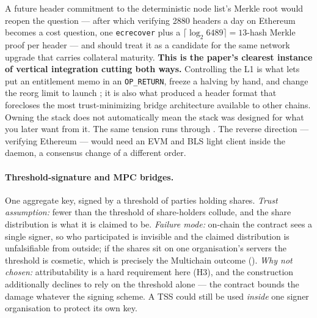 \noindent A future header commitment to the deterministic node list's Merkle root would reopen the
question --- after which verifying \num{2880} headers a day on Ethereum becomes a cost question, one
\texttt{ecrecover} plus a $\lceil \log_2 6489 \rceil = 13$-hash Merkle proof per header
\srcinferred --- and  should treat it as a candidate for the same network
upgrade that carries collateral maturity. \textbf{This is the paper's clearest instance of vertical
integration cutting both ways.} Controlling the L1 is what lets \Flux put an entitlement memo in an
\texttt{OP\_RETURN}, freeze a halving by hand, and change the reorg limit to launch \PoN; it is also
what produced a header format that forecloses the most trust-minimizing bridge architecture
available to other chains. Owning the stack does not automatically mean the stack was designed for
what you later want from it. The same tension runs through . The reverse direction
--- \fluxd verifying Ethereum --- would need an EVM and BLS light client inside the daemon, a
consensus change of a different order.

\paragraph{Threshold-signature and MPC bridges.} One aggregate key, signed by a threshold of parties
holding shares. \emph{Trust assumption:} fewer than the threshold of share-holders collude, and the
share distribution is what it is claimed to be. \emph{Failure mode:} on-chain the contract sees a
single signer, so who participated is invisible and the claimed distribution is unfalsifiable from
outside; if the shares sit on one organisation's servers the threshold is cosmetic, which is
precisely the Multichain outcome (). \emph{Why not chosen:}
attributability is a hard requirement here (H3), and the construction additionally declines to rely
on the threshold alone --- the contract bounds the damage whatever the signing scheme. A TSS could
still be used \emph{inside} one signer organisation to protect its own key.

